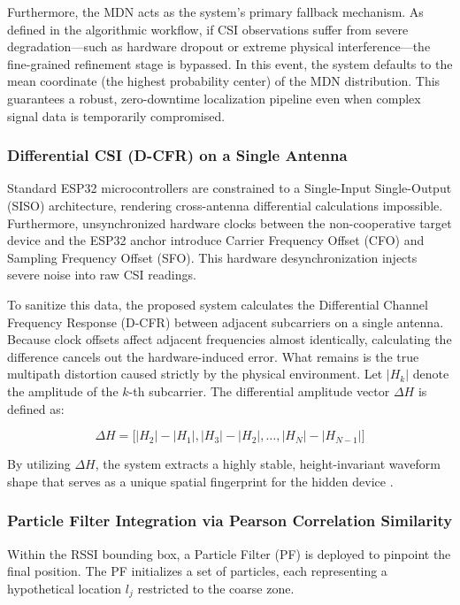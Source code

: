 Furthermore, the MDN acts as the system's primary fallback mechanism. As defined in the algorithmic workflow, if CSI observations suffer from severe degradation—such as hardware dropout or extreme physical interference—the fine-grained refinement stage is bypassed. In this event, the system defaults to the mean coordinate (the highest probability center) of the MDN distribution. This guarantees a robust, zero-downtime localization pipeline even when complex signal data is temporarily compromised.

\subsubsection{Differential CSI (D-CFR) on a Single Antenna}
\label{sec:dcfr}
Standard ESP32 microcontrollers are constrained to a Single-Input Single-Output (SISO) architecture, rendering cross-antenna differential calculations impossible. Furthermore, unsynchronized hardware clocks between the non-cooperative target device and the ESP32 anchor introduce Carrier Frequency Offset (CFO) and Sampling Frequency Offset (SFO). This hardware desynchronization injects severe noise into raw CSI readings.

To sanitize this data, the proposed system calculates the Differential Channel Frequency Response (D-CFR) between adjacent subcarriers on a single antenna. Because clock offsets affect adjacent frequencies almost identically, calculating the difference cancels out the hardware-induced error. What remains is the true multipath distortion caused strictly by the physical environment. Let $|H_k|$ denote the amplitude of the $k$-th subcarrier. The differential amplitude vector $\Delta H$ is defined as:

\begin{equation}
    \Delta H = \Big[ |H_2| - |H_1|, |H_3| - |H_2|, \dots, |H_N| - |H_{N-1}| \Big]
\end{equation}

By utilizing $\Delta H$, the system extracts a highly stable, height-invariant waveform shape that serves as a unique spatial fingerprint for the hidden device \cite{wu2012csi}.

\subsubsection{Particle Filter Integration via Pearson Correlation Similarity}
Within the RSSI bounding box, a Particle Filter (PF) is deployed to pinpoint the final position. The PF initializes a set of particles, each representing a hypothetical location $l_j$ restricted to the coarse zone. 


